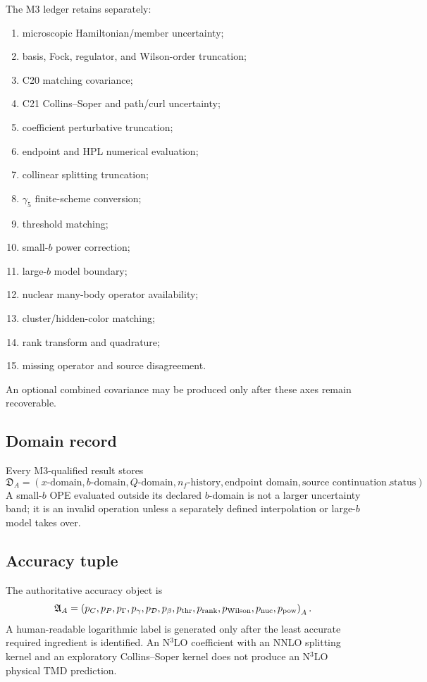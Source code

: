 \documentclass[11pt]{article}
\newcommand{\cD}{\mathcal D}
\begin{document}
The M3 ledger retains separately:
\begin{enumerate}
\item microscopic Hamiltonian/member uncertainty;
\item basis, Fock, regulator, and Wilson-order truncation;
\item C20 matching covariance;
\item C21 Collins--Soper and path/curl uncertainty;
\item coefficient perturbative truncation;
\item endpoint and HPL numerical evaluation;
\item collinear splitting truncation;
\item \(\gamma_5\) finite-scheme conversion;
\item threshold matching;
\item small-\(b\) power correction;
\item large-\(b\) model boundary;
\item nuclear many-body operator availability;
\item cluster/hidden-color matching;
\item rank transform and quadrature;
\item missing operator and source disagreement.
\end{enumerate}
An optional combined covariance may be produced only after these axes remain recoverable.

\subsection{Domain record}

Every M3-qualified result stores
\begin{equation}
 \mathfrak D_A=
 \left(
 x\text{-domain},
 b\text{-domain},
 Q\text{-domain},
 n_f\text{-history},
 \text{endpoint domain},
 \text{source continuation status}
 \right).
 \label{eq:domain-record}
\end{equation}
A small-\(b\) OPE evaluated outside its declared \(b\)-domain is not a larger uncertainty band; it is an invalid operation unless a separately defined interpolation or large-\(b\) model takes over.

\subsection{Accuracy tuple}

The authoritative accuracy object is
\begin{equation}
 \mathfrak A_A=
 \left(
 p_C,
 p_P,
 p_\Gamma,
 p_\gamma,
 p_\cD,
 p_\beta,
 p_{\rm thr},
 p_{\rm rank},
 p_{\rm Wilson},
 p_{\rm nuc},
 p_{\rm pow}
 \right)_A.
 \label{eq:accuracy-tuple}
\end{equation}
A human-readable logarithmic label is generated only after the least accurate required ingredient is identified.  An N\(^3\)LO coefficient with an NNLO splitting kernel and an exploratory Collins--Soper kernel does not produce an N\(^3\)LO physical TMD prediction.
\end{document}
